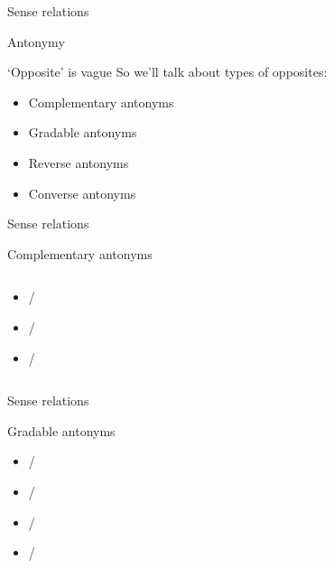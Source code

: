 \documentclass{beamer}
\newcommand{\subtwothree}{Sense relations}
\begin{document}
      \begin{frame}[t]{\subtwothree}
        \begin{alertblock}{Antonymy}
          
        \end{alertblock}
        \begin{block}{`Opposite' is vague}
          So we'll talk about types of opposites:
          \begin{itemize}
            \item Complementary antonyms
            \item Gradable antonyms
            \item Reverse antonyms
            \item Converse antonyms
          \end{itemize}
        \end{block}
      \end{frame}

      \begin{frame}[t]{\subtwothree}
        \begin{alertblock}{Complementary antonyms}
          
        \end{alertblock}
        \begin{columns}
            \begin{example}
              \begin{itemize}
                \item {}/
                \item {}/
                \item<2-> /
              \end{itemize}
            \end{example}
        \end{columns}
      \end{frame}

      \begin{frame}[t]{\subtwothree}
        \begin{alertblock}{Gradable antonyms}
          
        \end{alertblock}
        \begin{example}
          \begin{itemize}
            \item {}/
            \item {}/
            \item {}/
            \item {}/
          \end{itemize}
        \end{example}
      \end{frame}
\end{document}
